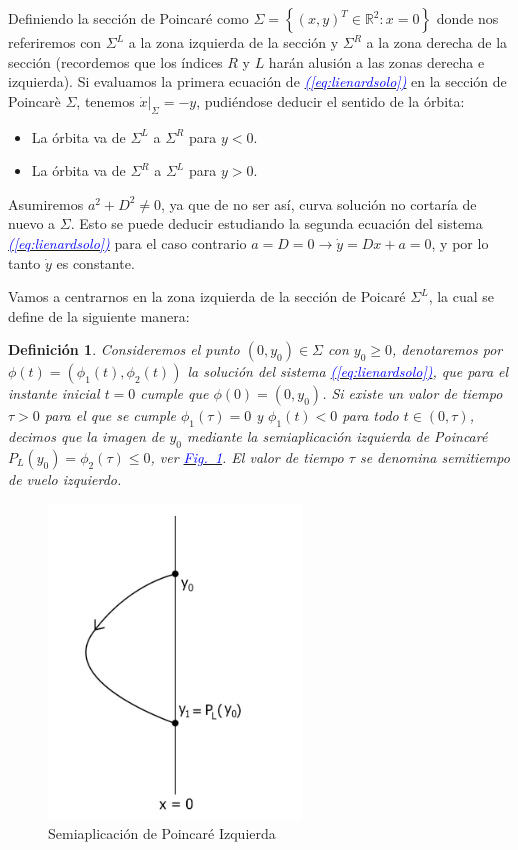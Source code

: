 \documentclass[12pt,a4paper]{report} %
\newtheorem{definicion}{Definición}[chapter] %
\newcommand{\fref}[1]{\hyperref[#1]{\textcolor{blue}{\textit{Fig.~\ref*{#1}}}}}
\newcommand{\eref}[1]{\hyperref[#1]{\textcolor{blue}{\textit{(\ref*{#1})}}}}
\begin{document}
	Definiendo la sección de Poincaré como $\varSigma=\left\{(x,y)^T\in \mathbb{R}^2:x=0\right\}$ donde nos referiremos con $\varSigma^L$ a la zona izquierda de la sección y $\varSigma^R$ a la zona derecha de la sección (recordemos que los índices $R$ y $L$ harán alusión a las zonas derecha e izquierda). Si evaluamos la primera ecuación de \eref{eq:lienardsolo} en la sección de Poincarè $\varSigma$, tenemos $\dot{x}|_{\varSigma}=-y$, pudiéndose deducir el sentido de la órbita:
	
	\begin{itemize}
		\item La órbita va de $\varSigma^L$ a $\varSigma^R$ para $y<0$.
		\item La órbita va de $\varSigma^R$ a $\varSigma^L$ para $y>0$.
	\end{itemize}
	
	Asumiremos $a^2+D^2\neq0$, ya que de no ser así, curva solución no cortaría de nuevo a $\varSigma$. Esto se puede deducir estudiando la segunda ecuación del sistema \eref{eq:lienardsolo} para el caso contrario $a=D=0 \longrightarrow \dot{y}=Dx+a=0$, y por lo tanto $\dot{y}$ es constante.
	
	\vspace{0.5cm}Vamos a centrarnos en la zona izquierda de la sección de Poicaré $\varSigma^L$, la cual se define de la siguiente manera:

	\begin{definicion}
		\label{def6}
		Consideremos el punto $(0,y_0)\in \varSigma$ con $y_0\geq0$, denotaremos por $\phi(t)=(\phi_1(t),\phi_2(t))$ la solución del sistema \eref{eq:lienardsolo}, que para el instante inicial $t=0$ cumple que $\phi(0)=(0,y_0)$. Si existe un valor de tiempo $\tau>0$ para el que se cumple $\phi_1(\tau)=0$ y $\phi_1(t)<0$ para todo $t\in(0,\tau)$, decimos que la imagen de $y_0$ mediante la semiaplicación izquierda de Poincaré $P_L(y_0)=\phi_2(\tau)\leq0$, ver \fref{fig:semiL}. El valor de tiempo $\tau$ se denomina semitiempo de vuelo izquierdo.
	\end{definicion}
	
	\begin{figure}[h]
		\centering
		\includegraphics[width=0.6\textwidth]{semiL.jpg}
		\caption{Semiaplicación de Poincaré Izquierda}
		\label{fig:semiL}
	\end{figure}\smallskip
	\newpage
	
\end{document}
